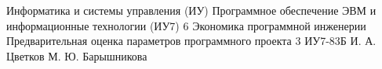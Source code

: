 \makereporttitle
{Информатика и системы управления (ИУ)}
{Программное обеспечение ЭВМ и информационные технологии (ИУ7)}
{6}
{Экономика программной инженерии}
{Предварительная оценка параметров программного проекта}
{3}
{ИУ7-83Б}
{И. А. Цветков}
{М. Ю. Барышникова}
{}
{}
